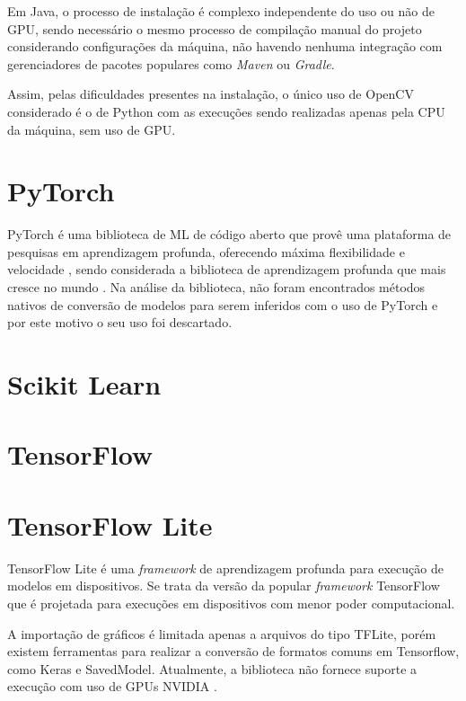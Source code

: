 Em Java, o processo de instalação é complexo independente do uso ou não de GPU, sendo necessário o mesmo processo de compilação manual do projeto considerando configurações da máquina, não havendo nenhuma integração com gerenciadores de pacotes populares como \textit{Maven} ou \textit{Gradle}.

Assim, pelas dificuldades presentes na instalação, o único uso de OpenCV considerado é o de Python com as execuções sendo realizadas apenas pela CPU da máquina, sem uso de GPU.

\section{PyTorch}

PyTorch é uma biblioteca de ML de código aberto que provê uma plataforma de pesquisas em aprendizagem profunda, oferecendo máxima flexibilidade e velocidade \cite{pytorch_what_is}, sendo considerada a biblioteca de aprendizagem profunda que mais cresce no mundo \cite{course_fast_ai}. Na análise da biblioteca, não foram encontrados métodos nativos de conversão de modelos para serem inferidos com o uso de PyTorch e por este motivo o seu uso foi descartado.

\section{Scikit Learn}

\section{TensorFlow}

\section{TensorFlow Lite}

TensorFlow Lite \cite{ml_site_tensorflow_lite} é uma \textit{framework} de aprendizagem profunda para execução de modelos em dispositivos. Se trata da versão da popular \textit{framework} TensorFlow que é projetada para execuções em dispositivos com menor poder computacional.

A importação de gráficos é limitada apenas a arquivos do tipo TFLite, porém existem ferramentas para realizar a conversão de formatos comuns em Tensorflow, como Keras e SavedModel. Atualmente, a biblioteca não fornece suporte a execução com uso de GPUs NVIDIA \cite{ml_site_tensorflow_lite_gpus}.

